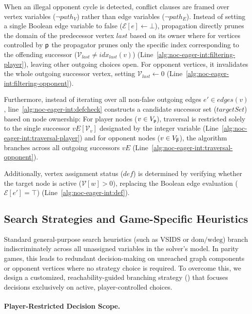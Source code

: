 \documentclass[a4paper,fleqn]{cas-sc}
\begin{document}
When an illegal opponent cycle is detected, conflict clauses are framed over vertex variables ($\neg path_V$) rather than edge variables ($\neg path_E$). Instead of setting a single Boolean edge variable to false ($\mathcal{E}[e] \gets \bot$), propagation directly prunes the domain of the predecessor vertex $\textit{last}$ based on its owner where for vertices controlled by $\mathsf{p}$ the propagator prunes only the specific index corresponding to the offending successor ($\mathcal{V}_{\textit{last}} \neq \textit{idx}_{\textit{last}}(v)$) (Line~\ref{alg:noc-eager-int:filtering-player}), leaving other outgoing choices open. For opponent vertices, it invalidates the whole outgoing successor vertex, setting $\mathcal{V}_{\textit{last}} \gets 0$ (Line~\ref{alg:noc-eager-int:filtering-opponent}).

Furthermore, instead of iterating over all non-false outgoing edges $e' \in \textit{edges}(v)$, line~\ref{alg:noc-eager-int:defcheck} constructs a candidate successor set ($\textit{targetSet}$) based on node ownership:
For player nodes ($v \in V_{\mathsf{p}}$), traversal is restricted solely to the single successor $vE[\mathcal{V}_v]$ designated by the integer variable (Line~\ref{alg:noc-eager-int:traversal-player}) and for opponent nodes ($v \in V_{\overline{\mathsf{p}}}$), the algorithm branches across all outgoing successors $vE$ (Line~\ref{alg:noc-eager-int:traversal-opponent}).

Additionally, vertex assignment status ($\textit{def}$) is determined by verifying whether the target node is active ($\mathcal{V}[w] > 0$), replacing the Boolean edge evaluation ($\mathcal{E}[e'] = \top$) (Line~\ref{alg:noc-eager-int:def}).

\subsection{Search Strategies and Game-Specific Heuristics}\label{sec:search_heuristics}

Standard general-purpose search heuristics (such as VSIDS or $\text{dom}/\text{wdeg}$) branch indiscriminately across all unassigned variables in the solver's model. In parity games, this leads to redundant decision-making on unreached graph components or opponent vertices where no strategy choice is required. To overcome this, we design a customized, reachability-guided branching strategy (\nocbrancher) that focuses decisions exclusively on active, player-controlled choices.

\paragraph{Player-Restricted Decision Scope.}
\end{document}
